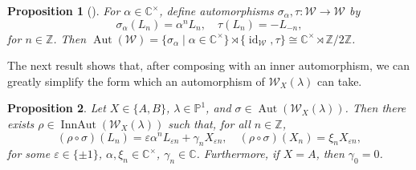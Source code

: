 \documentclass[11pt, svgnames]{amsart}
\newcommand{\ZZ}{\mathbb{Z}}
\newcommand{\CC}{\mathbb{C}}
\newcommand{\PP}{\mathbb{P}}
\newcommand{\W}{\mathcal{W}}
\DeclareMathOperator{\id}{id}
\DeclareMathOperator{\Aut}{Aut}
\DeclareMathOperator{\InnAut}{InnAut}
\newtheorem{proposition}{Proposition}[section]
\theoremstyle{definition}
\begin{document}
\begin{proposition}[{\cite[Theorem 1.1]{BavulaWitt}}]\label{prop:automorphisms Witt}
    For $\alpha \in \CC^\times$, define automorphisms $\sigma_\alpha, \tau \colon \W \to \W$ by
    $$\sigma_\alpha(L_n) = \alpha^n L_n, \quad \tau(L_n) = -L_{-n},$$
    for $n \in \ZZ$. Then $\Aut(\W) = \{\sigma_\alpha \mid \alpha \in \CC^\times\} \rtimes \{\id_\W, \tau\} \cong \CC^\times \rtimes \ZZ/2\ZZ$.
\end{proposition}

The next result shows that, after composing with an inner automorphism, we can greatly simplify the form which an automorphism of $\W_X(\lambda)$ can take.

\begin{proposition}\label{prop:automorphism nice form}
    Let $X \in \{A,B\}$, $\lambda \in \PP^1$, and $\sigma \in \Aut(\W_X(\lambda))$. Then there exists $\rho \in \InnAut(\W_X(\lambda))$ such that, for all $n \in \ZZ$,
    $$(\rho \circ \sigma)(L_n) = \varepsilon \alpha^n L_{\varepsilon n} + \gamma_n X_{\varepsilon n}, \quad (\rho \circ \sigma)(X_n) = \xi_n X_{\varepsilon n},$$
    for some $\varepsilon \in \{\pm 1\}$, $\alpha, \xi_n \in \CC^\times$, $\gamma_n \in \CC$. Furthermore, if $X = A$, then $\gamma_0 = 0$.
\end{proposition}
\end{document}
